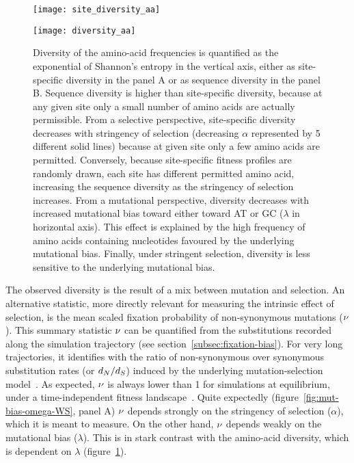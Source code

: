 \begin{figure}[h]
    \centering
    \begin{minipage}{0.49\linewidth}
        \texttt{[image: site\_diversity\_aa]}
    \end{minipage}
    \hfill
    \begin{minipage}{0.49\linewidth}
        \texttt{[image: diversity\_aa]}
    \end{minipage}
    \hfill
    \caption[Diversity of amino acids]{
    Diversity of the amino-acid frequencies is quantified as the exponential of Shannon's entropy in the vertical axis, either as site-specific diversity in the panel A or as sequence diversity in the panel B.
    Sequence diversity is higher than site-specific diversity, because at any given site only a small number of amino acids are actually permissible.
    From a selective perspective, site-specific diversity decreases with stringency of selection (decreasing $\alpha$ represented by 5 different solid lines) because at given site only a few amino acids are permitted.
    Conversely, because site-specific fitness profiles are randomly drawn, each site has different permitted amino acid, increasing the sequence diversity as the stringency of selection increases.
    From a mutational perspective, diversity decreases with increased mutational bias toward either toward AT or GC ($\lambda$ in horizontal axis).
    This effect is explained by the high frequency of amino acids containing nucleotides favoured by the underlying mutational bias.
    Finally, under stringent selection, diversity is less sensitive to the underlying mutational bias.}
    \label{fig:mut-bias-diversity-aa}
\end{figure}

The observed diversity is the result of a mix between mutation and selection.
An alternative statistic, more directly relevant for measuring the intrinsic effect of selection, is the mean scaled fixation probability of \gls{non-synonymous} mutations ($\nu$).
This summary statistic $\nu$ can be quantified from the \glspl{substitution} recorded along the simulation trajectory (see section~\ref{subsec:fixation-bias}).
For very long trajectories, it identifies with the ratio of \gls{non-synonymous} over \gls{synonymous} \gls{substitution} rates (or $d_N / d_S$) induced by the underlying mutation-selection model~\citep{Spielman2015, DosReis2015, Jones2016}.
As expected, $\nu$ is always lower than 1 for simulations at equilibrium, under a time-independent fitness landscape~\citep{Spielman2015}.
Quite expectedly (figure~\ref{fig:mut-bias-omega-WS}, panel A) $\nu$ depends strongly on the stringency of selection ($\alpha$), which it is meant to measure.
On the other hand, $\nu$ depends weakly on the mutational bias ($\lambda$).
This is in stark contrast with the amino-acid diversity, which is dependent on $\lambda$ (figure~\ref{fig:mut-bias-diversity-aa}).

